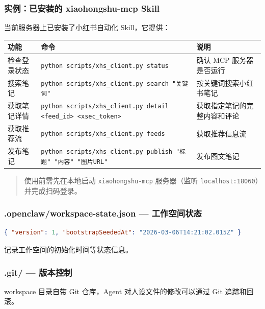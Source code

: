 \subsubsection{实例：已安装的 xiaohongshu-mcp Skill}


当前服务器上已安装了小红书自动化 Skill，它提供：

\begin{table}[h]
\centering
\small
\begin{tabular}{|l|l|l|}
\hline
功能 & 命令 & 说明 \\
\hline
检查登录状态 & \texttt{python scripts/xhs\_client.py status} & 确认 MCP 服务器是否运行 \\
\hline
搜索笔记 & \texttt{python scripts/xhs\_client.py search "关键词"} & 按关键词搜索小红书笔记 \\
\hline
获取笔记详情 & \texttt{python scripts/xhs\_client.py detail <feed\_id> <xsec\_token>} & 获取指定笔记的完整内容和评论 \\
\hline
获取推荐流 & \texttt{python scripts/xhs\_client.py feeds} & 获取推荐信息流 \\
\hline
发布笔记 & \texttt{python scripts/xhs\_client.py publish "标题" "内容" "图片URL"} & 发布图文笔记 \\
\hline
\end{tabular}
\end{table}

\begin{quote}
使用前需先在本地启动 \texttt{xiaohongshu-mcp} 服务器（监听 \texttt{localhost:18060}）并完成扫码登录。
\end{quote}

\subsubsection{.openclaw/workspace-state.json --- 工作空间状态}


\begin{lstlisting}[language=json]
{ "version": 1, "bootstrapSeededAt": "2026-03-06T14:21:02.015Z" }
\end{lstlisting}

记录工作空间的初始化时间等状态信息。

\subsubsection{.git/ --- 版本控制}


workspace 目录自带 Git 仓库，Agent 对人设文件的修改可以通过 Git 追踪和回滚。

